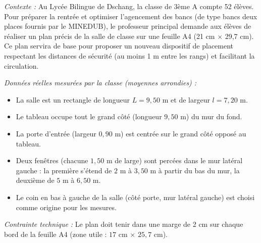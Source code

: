 \documentclass[11pt]{article}
\newcounter{popsec}
\newcounter{popsub}
\newcommand{\courssub}[1]{%
  \stepcounter{popsub}%
  \par\vspace{9pt}\noindent{\popxbold\fontsize{11.5}{13}\selectfont\color{popink}{\color{poporange}\thepopsec.\thepopsub}\hspace{6pt}#1}\par\nopagebreak\vspace{4pt}
}
\begin{document}
\courssub{Situation}
\emph{Contexte :} Au Lycée Bilingue de Dschang, la classe de 3ème A compte 52 élèves. Pour préparer la rentrée et optimiser l'agencement des bancs (de type \og bancs deux places \fg{} fournis par le MINEDUB), le professeur principal demande aux élèves de réaliser un plan précis de la salle de classe sur une feuille A4 (21 cm $\times$ 29,7 cm). Ce plan servira de base pour proposer un nouveau dispositif de placement respectant les distances de sécurité (au moins 1 m entre les rangs) et facilitant la circulation.

\emph{Données réelles mesurées par la classe (moyennes arrondies) :}
\begin{itemize}
    \item La salle est un rectangle de longueur $L = 9,50$ m et de largeur $l = 7,20$ m.
    \item Le tableau occupe tout le grand côté (longueur $9,50$ m) du mur du fond.
    \item La porte d'entrée (largeur $0,90$ m) est centrée sur le grand côté opposé au tableau.
    \item Deux fenêtres (chacune $1,50$ m de large) sont percées dans le mur latéral gauche : la première s'étend de $2$ m à $3,50$ m à partir du bas du mur, la deuxième de $5$ m à $6,50$ m.
    \item Le coin en bas à gauche de la salle (côté porte, mur latéral gauche) est choisi comme origine pour les mesures.
\end{itemize}

\emph{Contrainte technique :} Le plan doit tenir dans une marge de 2 cm sur chaque bord de la feuille A4 (zone utile : $17$ cm $\times$ $25,7$ cm).
\end{document}
